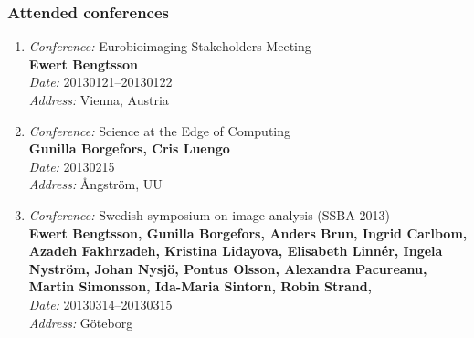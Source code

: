 \subsubsection{Attended conferences}
\begin{enumerate}
\item 
{\em Conference:} Eurobioimaging Stakeholders Meeting~\\
{\bf Ewert Bengtsson}~\\
{\em Date:} 20130121--20130122~\\
{\em Address:} Vienna, Austria



\item 
{\em Conference:} Science at the Edge of Computing~\\
{\bf Gunilla Borgefors, Cris Luengo}~\\
{\em Date:} 20130215~\\
{\em Address:} {\AA}ngstr\"{o}m, UU

\item 
{\em Conference:} Swedish symposium on image analysis (SSBA 2013)~\\
{\bf  Ewert Bengtsson, Gunilla Borgefors, Anders Brun, Ingrid Carlbom, Azadeh Fakhrzadeh, Kristina Lidayova, Elisabeth Linn\'{e}r, Ingela Nystr\"{o}m, Johan Nysj\"{o}, Pontus Olsson, Alexandra Pacureanu, Martin Simonsson, Ida-Maria Sintorn, Robin Strand, }~\\
{\em Date:} 20130314--20130315~\\
{\em Address:} G\"{o}teborg~\\



\end{enumerate}

